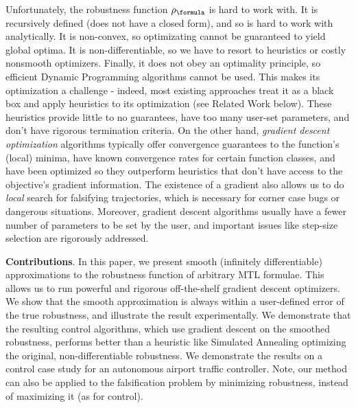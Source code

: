 

Unfortunately, the robustness function $\robf$ is hard to work with.
It is recursively defined (does not have a closed form), and so is hard to work with analytically.
It is non-convex, so optimizating cannot be guaranteed to yield global optima.
It is non-differentiable, so we have to resort to heuristics or costly nonsmooth optimizers. 
Finally, it does not obey an optimality principle, so efficient Dynamic Programming algorithms cannot be used.
This makes its optimization a challenge - indeed, most existing approaches treat it as a black box and apply heuristics to its optimization (see Related Work below).
These heuristics provide little to no guarantees, have too many user-set parameters, and don't have rigorous termination criteria.
On the other hand, \textit{gradient descent optimization} algorithms typically offer convergence guarantees to the function's (local) minima, have known convergence rates for certain function classes, and have been optimized so they outperform heuristics that don't have access to the objective's gradient information.
The existence of a gradient also allows us to do \textit{local} search for falsifying trajectories, which is necessary for corner case bugs or dangerous situations.
Moreover, gradient descent algorithms usually have a fewer number of parameters to be set by the user, and important issues like step-size selection are rigorously addressed.

\textbf{Contributions}. In this paper, we present smooth (infinitely differentiable) approximations to the robustness function of arbitrary MTL formulae.
This allows us to run powerful and rigorous off-the-shelf gradient descent optimizers.
We show that the smooth approximation is always within a user-defined error of the true robustness, and illustrate the result experimentally.
We demonstrate that the resulting control algorithms, which use gradient descent on the smoothed robustness, performs better than a heuristic like Simulated Annealing optimizing the original, non-differentiable robustness.
We demonstrate the results on a control case study for an autonomous airport traffic controller. Note, our method can also be applied to the falsification problem by minimizing robustness, instead of maximizing it (as for control).

